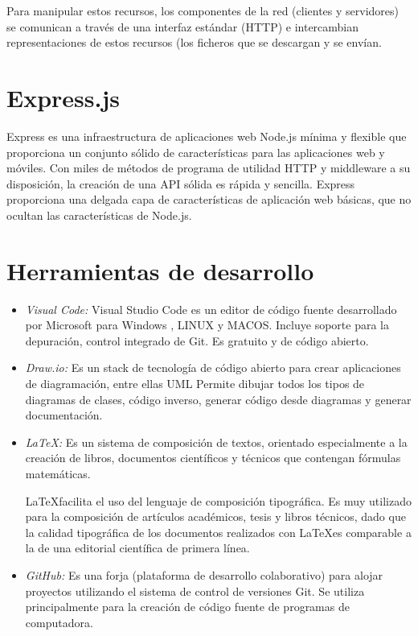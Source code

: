  Para manipular estos recursos, los componentes de la red (clientes y servidores) se comunican a través de una interfaz estándar (HTTP) e intercambian representaciones de estos recursos (los ficheros que se descargan y se envían.
 
\section{Express.js}

Express es una infraestructura de aplicaciones web Node.js mínima y flexible que proporciona un conjunto sólido de características para las aplicaciones web y móviles.
Con miles de métodos de programa de utilidad HTTP y middleware a su disposición, la creación de una API sólida es rápida y sencilla.
Express proporciona una delgada capa de características de aplicación web básicas, que no ocultan las características de Node.js.

\section{Herramientas de desarrollo}

\begin{itemize}

\item \emph {Visual Code:} Visual Studio Code es un editor de código fuente desarrollado por Microsoft para Windows , \gls{LINUX} y \gls{MACOS}. Incluye soporte para la depuración, control integrado de Git. Es gratuito y de código abierto.

\item \emph {Draw.io:} Es un stack de tecnología de código abierto para crear aplicaciones de diagramación, entre ellas \gls{UML}
Permite dibujar todos los tipos de diagramas de clases, código inverso, generar código desde diagramas y generar documentación.

\item \emph{\LaTeX:} Es un sistema de composición de textos, orientado especialmente a la creación de libros, documentos científicos y técnicos que contengan fórmulas matemáticas.

\LaTeX facilita el uso del lenguaje de composición tipográfica. Es muy utilizado para la composición de artículos académicos, tesis y libros técnicos, dado que la calidad tipográfica de los documentos realizados con \LaTeX es comparable a la de una editorial científica de primera línea.

\item \emph{GitHub:} Es una forja (plataforma de desarrollo colaborativo) para alojar proyectos utilizando el sistema de control de versiones Git. Se utiliza principalmente para la creación de código fuente de programas de computadora.

\end{itemize}

